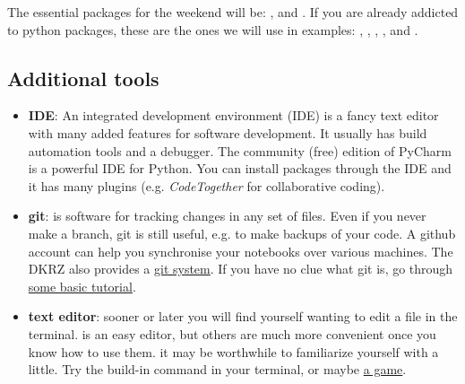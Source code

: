 \documentclass{article}
\begin{document}
The essential packages for the weekend will be: ,  and . If you are already addicted to python packages, these are the ones we will use in examples: , , , ,  and .




\subsection*{ Additional tools} 
\begin{itemize}
    \item \textbf{IDE}: An integrated development environment (IDE) is a fancy text editor with many added features for software development. It usually has build automation tools and a debugger. The community (free) edition of PyCharm is a powerful IDE for Python. You can install packages through the IDE and it has many plugins (e.g. \textit{CodeTogether} for collaborative coding).
    
    \item \textbf{git}: is software for tracking changes in any set of files. Even if you never make a branch, git is still useful, e.g. to make backups of your code. A github account can help you synchronise your notebooks over various machines. The DKRZ also provides a \href{https://docs.dkrz.de/doc/software\%26services/gitlab-git-repository-manager.html}{git system}. If you have no clue what git is, go through \href{https://medium.com/cassandra-cryptoassets/git-basics-a-step-by-step-tutorial-c3098934fa95}{some basic tutorial}.
    
    
    \item \textbf{text editor}: sooner or later you will find yourself wanting to edit a file in the terminal.  is an easy editor, but others are much more convenient once you know how to use them. it may be worthwhile to familiarize yourself with  a little. Try the build-in  command in your terminal, or maybe \href{https://vim-adventures.com/}{a game}.
\end{itemize}
\end{document}
